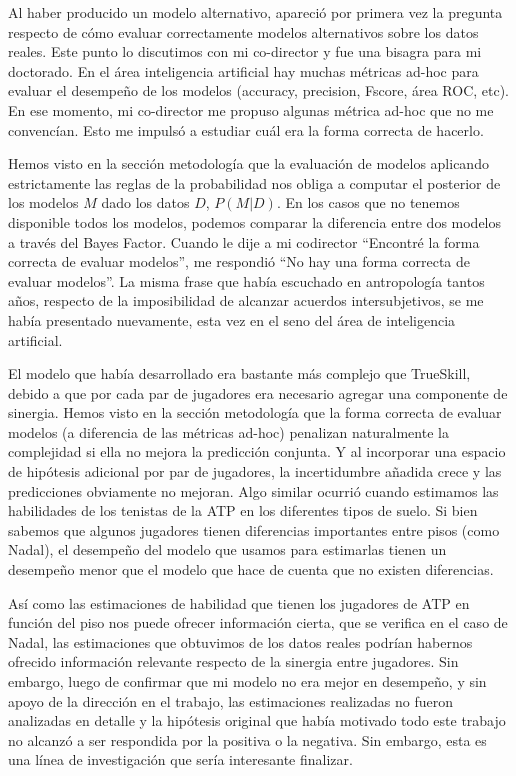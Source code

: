 \documentclass[a4paper,11pt]{book}
\theoremstyle{definition}
\begin{document}

Al haber producido un modelo alternativo, apareció por primera vez la pregunta respecto de cómo evaluar correctamente modelos alternativos sobre los datos reales.
%
Este punto lo discutimos con mi co-director y fue una bisagra para mi doctorado.
%
En el área inteligencia artificial hay muchas métricas ad-hoc para evaluar el desempeño de los modelos (accuracy, precision, Fscore, área ROC, etc).
%
En ese momento, mi co-director me propuso algunas métrica ad-hoc que no me convencían.
%
Esto me impulsó a estudiar cuál era la forma correcta de hacerlo.


Hemos visto en la sección metodología que la evaluación de modelos aplicando estrictamente las reglas de la probabilidad nos obliga a computar el posterior de los modelos $M$ dado los datos $D$, $P(M|D)$.
%
En los casos que no tenemos disponible todos los modelos, podemos comparar la diferencia entre dos modelos a través del Bayes Factor.
%
Cuando le dije a mi codirector ``Encontré la forma correcta de evaluar modelos'', me respondió ``No hay una forma correcta de evaluar modelos''.
%
La misma frase que había escuchado en antropología tantos años, respecto de la imposibilidad de alcanzar acuerdos intersubjetivos, se me había presentado nuevamente, esta vez en el seno del área de inteligencia artificial.


El modelo que había desarrollado era bastante más complejo que TrueSkill, debido a que por cada par de jugadores era necesario agregar una componente de sinergia.
%
Hemos visto en la sección metodología que la forma correcta de evaluar modelos (a diferencia de las métricas ad-hoc) penalizan naturalmente la complejidad si ella no mejora la predicción conjunta.
%
Y al incorporar una espacio de hipótesis adicional por par de jugadores, la incertidumbre añadida crece y las predicciones obviamente no mejoran.
%
Algo similar ocurrió cuando estimamos las habilidades de los tenistas de la ATP en los diferentes tipos de suelo.
%
Si bien sabemos que algunos jugadores tienen diferencias importantes entre pisos (como Nadal), el desempeño del modelo que usamos para estimarlas tienen un desempeño menor que el modelo que hace de cuenta que no existen diferencias.


Así como las estimaciones de habilidad que tienen los jugadores de ATP en función del piso nos puede ofrecer información cierta, que se verifica en el caso de Nadal, las estimaciones que obtuvimos de los datos reales podrían habernos ofrecido información relevante respecto de la sinergia entre jugadores.
%
Sin embargo, luego de confirmar que mi modelo no era mejor en desempeño, y sin apoyo de la dirección en el trabajo, las estimaciones realizadas no fueron analizadas en detalle y la hipótesis original que había motivado todo este trabajo no alcanzó a ser respondida por la positiva o la negativa.
%
Sin embargo, esta es una línea de investigación que sería interesante finalizar.
\end{document}
